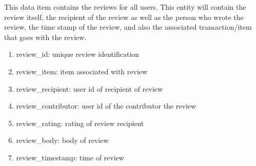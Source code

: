 \begin{description}[font=\bfseries\itshape]
\item[review:] This data item contains the reviews for all users.  This entity will contain the review itself, the recipient of the review as well as the person who wrote the review, the time stamp of the review, and also the associated transaction/item that goes with the review.
\begin{enumerate}
\item review\_id: unique review identification
\item review\_item: item associated with review
\item review\_recipient: user id of recipient of review
\item review\_contributor: user id of the contributor the review
\item review\_rating: rating of review recipient
\item review\_body: body of review
\item review\_timestamp: time of review
\end{enumerate}

\end{description}